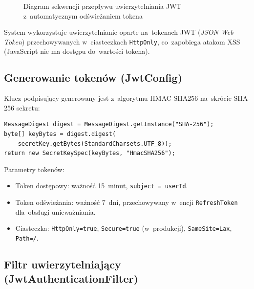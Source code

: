 \begin{figure}[H]
\caption{Diagram sekwencji przepływu uwierzytelniania JWT z~automatycznym odświeżaniem tokena}
\label{fig:jwt_sequence}
\end{figure}

System wykorzystuje uwierzytelnianie oparte na~tokenach JWT (\textit{JSON Web Token}) przechowywanych w~ciasteczkach \texttt{HttpOnly}, co~zapobiega atakom XSS (JavaScript nie ma dostępu do~wartości tokena).

\subsection{Generowanie tokenów (JwtConfig)}

Klucz podpisujący generowany jest z~algorytmu HMAC-SHA256 na~skrócie SHA-256 sekretu:

\begin{verbatim}
MessageDigest digest = MessageDigest.getInstance("SHA-256");
byte[] keyBytes = digest.digest(
    secretKey.getBytes(StandardCharsets.UTF_8));
return new SecretKeySpec(keyBytes, "HmacSHA256");
\end{verbatim}

Parametry tokenów:
\begin{itemize}
    \item Token dostępowy: ważność 15~minut, \texttt{subject = userId}.
    \item Token odświeżania: ważność 7~dni, przechowywany w~encji \texttt{RefreshToken} dla~obsługi unieważniania.
    \item Ciasteczka: \texttt{HttpOnly=true}, \texttt{Secure=true} (w~produkcji), \texttt{SameSite=Lax}, \texttt{Path=/}.
\end{itemize}

\subsection{Filtr uwierzytelniający (JwtAuthenticationFilter)}

